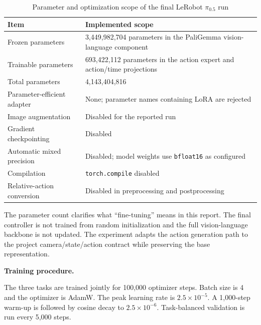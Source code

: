 \begin{table}[htbp]
  \centering
  \caption{Parameter and optimization scope of the final LeRobot $\pi_{0.5}$ run}
  \label{tab:ch4-training-scope}
  \small
  \begin{tabularx}{\textwidth}{p{}X}
    \toprule
    \textbf{Item} & \textbf{Implemented scope} \\
    \midrule
    Frozen parameters & 3,449,982,704 parameters in the PaliGemma vision-language component \\
    Trainable parameters & 693,422,112 parameters in the action expert and action/time projections \\
    Total parameters & 4,143,404,816 \\
    Parameter-efficient adapter & None; parameter names containing LoRA are rejected \\
    Image augmentation & Disabled for the reported run \\
    Gradient checkpointing & Disabled \\
    Automatic mixed precision & Disabled; model weights use \texttt{bfloat16} as configured \\
    Compilation & \texttt{torch.compile} disabled \\
    Relative-action conversion & Disabled in preprocessing and postprocessing \\
    \bottomrule
  \end{tabularx}
\end{table}

The parameter count clarifies what ``fine-tuning'' means in this report. The
final controller is not trained from random initialization and the full
vision-language backbone is not updated. The experiment adapts the action
generation path to the project camera/state/action contract while preserving
the base representation.

\medskip
\noindent\textbf{Training procedure.}

The three tasks are trained jointly for 100,000 optimizer steps. Batch size is 4 and the optimizer is AdamW. The peak learning rate is \(2.5\times10^{-5}\). A 1,000-step warm-up is followed by cosine decay to \(2.5\times10^{-6}\). Task-balanced validation is run every 5,000 steps.

